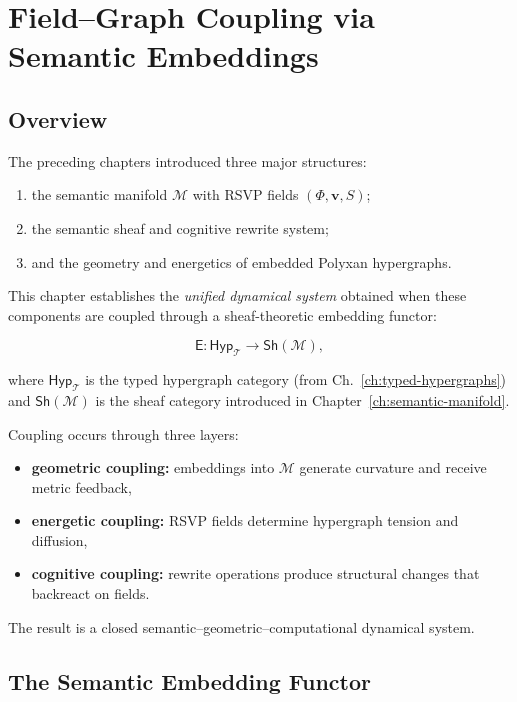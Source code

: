 \chapter{Field--Graph Coupling via Semantic Embeddings}
\label{ch:coupling}

\section{Overview}

The preceding chapters introduced three major structures:

\begin{enumerate}
  \item the semantic manifold $\mathcal{M}$ with RSVP fields $(\Phi,\mathbf{v},S)$;
  \item the semantic sheaf and cognitive rewrite system;
  \item and the geometry and energetics of embedded Polyxan hypergraphs.
\end{enumerate}

This chapter establishes the \emph{unified dynamical system} obtained when these
components are coupled through a sheaf-theoretic embedding functor:

\[
\mathsf{E} : 
\mathsf{Hyp}_{\mathcal{T}}
\longrightarrow 
\mathsf{Sh}(\mathcal{M}),
\]

where $\mathsf{Hyp}_{\mathcal{T}}$ is the typed hypergraph category (from
Ch.~\ref{ch:typed-hypergraphs}) and $\mathsf{Sh}(\mathcal{M})$ is the sheaf category introduced in Chapter~\ref{ch:semantic-manifold}.

Coupling occurs through three layers:

\begin{itemize}
  \item \textbf{geometric coupling:} embeddings into $\mathcal{M}$ generate curvature and receive metric feedback,
  \item \textbf{energetic coupling:} RSVP fields determine hypergraph tension and diffusion,
  \item \textbf{cognitive coupling:} rewrite operations produce structural changes that backreact on fields.
\end{itemize}

The result is a closed semantic–geometric–computational dynamical system.


\section{The Semantic Embedding Functor}

